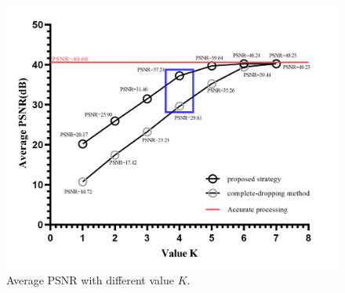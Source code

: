 \documentclass[lettersize,journal]{IEEEtran}
\begin{document}
\begin{figure}[htb]
	\centering
	\includegraphics[width=\linewidth]{Fig/Average PSNR with different K value.png}
	{\color{red}\caption{Average PSNR with different value $K$.}}
	\label{fig9}
\end{figure}
\end{document}
